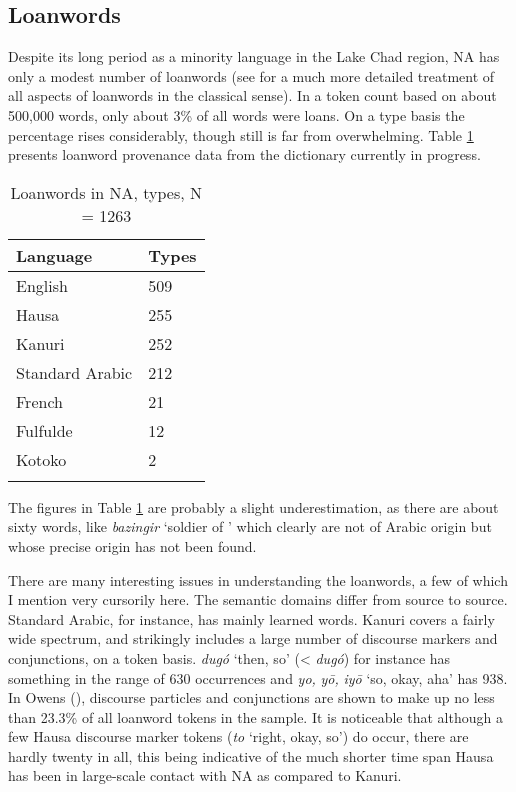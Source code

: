 \documentclass[output=paper]{langsci/langscibook}
\begin{document}
\subsection{Loanwords}\label{loans}

Despite its long period as a minority language in the Lake Chad region, NA has only a modest number of loanwords (see \citealt{Owens2000article} for a much more detailed treatment of all aspects of loanwords in the classical sense). In a token count based on about 500,000 words, only about 3\% of all words were loans. On a type basis the percentage rises considerably, though still is far from overwhelming. Table \ref{tab:nigeria:1} presents loanword provenance data from the dictionary currently in progress.

\begin{table}
\begin{tabularx}{\textwidth}{XX}
\lsptoprule
Language & Types\\
\midrule
English & 509 \\
Hausa & 255 \\ 
Kanuri & 252\\
Standard Arabic & 212\\
French & 21 \\
Fulfulde & 12 \\
Kotoko & 2 \\
\lspbottomrule
\end{tabularx}
\caption{Loanwords in NA, types, N = 1263}
\label{tab:nigeria:1}
\end{table}

The figures in Table \ref{tab:nigeria:1} are probably a slight underestimation, as there are about sixty words, like \textit{bazingir} ‘soldier of ’ which clearly are not of Arabic origin but whose precise origin has not been found.

There are many interesting issues in understanding the loanwords, a few of which I mention very cursorily here. The semantic domains differ from source to source. Standard Arabic, for instance, has mainly learned words. Kanuri covers a fairly wide spectrum, and strikingly includes a large number of discourse markers and conjunctions, on a token basis. \textit{dugó} ‘then, so’ (< \textit{dugó}) for instance has something in the range of 630 occurrences and \textit{yo,} \textit{yō,} \textit{iyō} ‘so, okay, aha’ has 938. In Owens (\citeyear[303]{Owens2000article}), discourse particles and conjunctions are shown to make up no less than 23.3\% of all loanword tokens in the sample. It is noticeable that although a few Hausa discourse marker tokens (\textit{to} ‘right, okay, so’) do occur, there are hardly twenty in all, this being indicative of the much shorter time span Hausa has been in large-scale contact with NA as compared to Kanuri.
\end{document}
